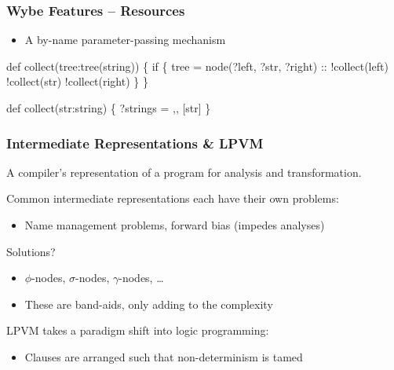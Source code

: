 \documentclass{beamer}
\begin{document}
\begin{frame}[fragile]
  \frametitle{Wybe Features -- Resources}

  \begin{itemize}
    \item A by-name parameter-passing mechanism 
  \end{itemize}
  \begin{example}
    \begin{semiverbatim}

def collect(tree:tree(string)) \{
    if \{ tree = node(?left, ?str, ?right) ::
          !collect(left)
          !collect(str) 
          !collect(right)
    \}
\}

def collect(str:string) \{ 
    ?\alert<2>{strings} =  ,, [str] 
\}
\end{semiverbatim}
  \end{example}
\end{frame}

\begin{frame}
  \frametitle{Intermediate Representations \& LPVM}
  
  A compiler's representation of a program for analysis and transformation.

  \vspace{2em}

  Common intermediate representations each have their own problems:
  \begin{itemize}
    \item Name management problems, forward bias (impedes analyses)
  \end{itemize}
  
  Solutions?
  \begin{itemize}
    \item $\phi$-nodes, $\sigma$-nodes, $\gamma$-nodes, \dots 
    \item These are band-aids, only adding to the complexity
  \end{itemize}

  \vspace{2em}

  LPVM takes a paradigm shift into logic programming:
  \begin{itemize}
    \item Clauses are arranged such that non-determinism is tamed
  \end{itemize}
\end{frame}
\end{document}
